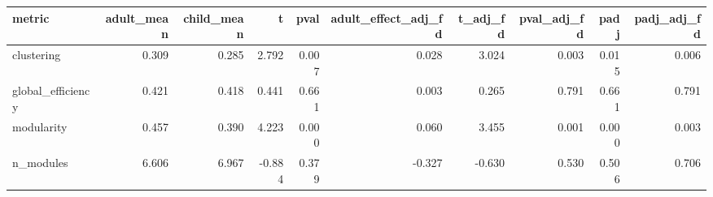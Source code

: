 \begin{tabular}{lrrrrrrrrr}
\toprule
metric & adult_mean & child_mean & t & pval & adult_effect_adj_fd & t_adj_fd & pval_adj_fd & padj & padj_adj_fd \\
\midrule
clustering & 0.309 & 0.285 & 2.792 & 0.007 & 0.028 & 3.024 & 0.003 & 0.015 & 0.006 \\
global_efficiency & 0.421 & 0.418 & 0.441 & 0.661 & 0.003 & 0.265 & 0.791 & 0.661 & 0.791 \\
modularity & 0.457 & 0.390 & 4.223 & 0.000 & 0.060 & 3.455 & 0.001 & 0.000 & 0.003 \\
n_modules & 6.606 & 6.967 & -0.884 & 0.379 & -0.327 & -0.630 & 0.530 & 0.506 & 0.706 \\
\bottomrule
\end{tabular}
